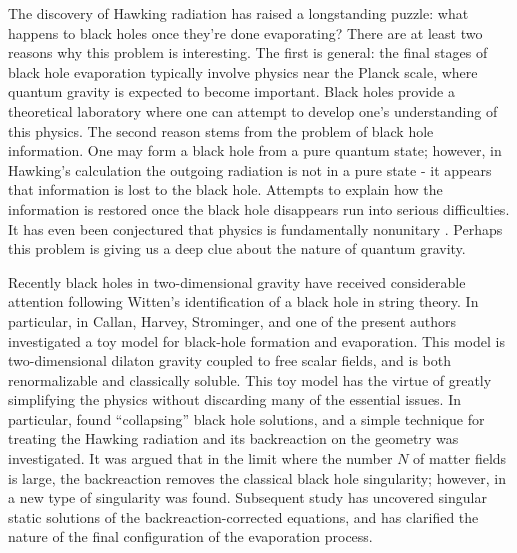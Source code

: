 
The discovery of Hawking radiation 
has raised a
longstanding puzzle:  what happens to black holes once they're done
evaporating? There are at least two reasons why this problem is interesting.
The first is general:
the final stages of black hole
evaporation typically involve physics near the Planck scale, where quantum
gravity is expected to become important.  Black holes provide  a theoretical
laboratory where one can attempt to develop one's understanding of this
physics.  The second reason stems from the problem of black hole
information.
One may form a black hole from a pure quantum state;  however,
in Hawking's calculation the outgoing radiation is not in a pure state
- it
appears that
information is lost to the black hole.  Attempts to explain how the
information is restored once the black hole disappears run into serious
difficulties. It has even been conjectured that physics is fundamentally
nonunitary .  Perhaps this problem is giving us a deep clue
about the nature of quantum gravity.

Recently black holes in two-dimensional gravity have received considerable
attention  following Witten's
identification of a black hole in string theory.
In particular, in  Callan, Harvey, Strominger, and one of the
present authors investigated a toy model for black-hole
formation and evaporation.
This model is two-dimensional dilaton gravity coupled to
free scalar fields, and is both renormalizable and classically soluble.
This toy model has the virtue of greatly simplifying the
physics without discarding many of the essential issues. In particular,
 found ``collapsing'' black hole solutions, and a
simple technique for treating the Hawking radiation and its backreaction on
the geometry was investigated.  It was argued that in the limit where the
number $N$ of matter fields is large, the backreaction removes
the classical black hole singularity; however, in  a new type
of singularity was found.  Subsequent study  has
uncovered singular
static solutions of the backreaction-corrected equations, and
has clarified the nature of the final configuration of the
evaporation process.

